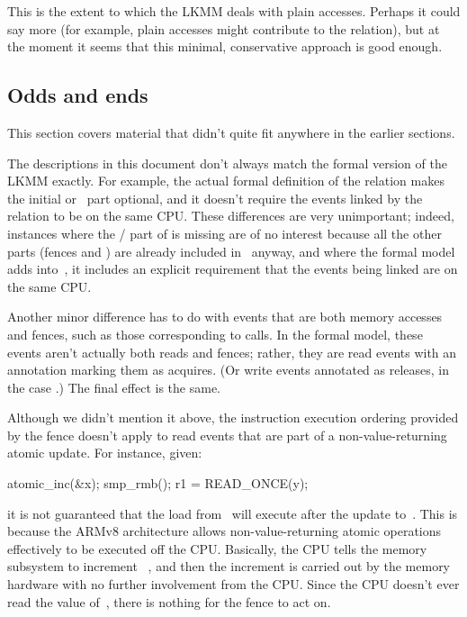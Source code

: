 This is the extent to which the LKMM deals with plain accesses.
Perhaps it could say more (for example, plain accesses might
contribute to the  relation), but at the moment it seems that this
minimal, conservative approach is good enough.


\subsection{Odds and ends}
\label{sec:docs:explanation:Odds and ends}

This section covers material that didn't quite fit anywhere in the
earlier sections.

The descriptions in this document don't always match the formal
version of the LKMM exactly.
For example, the actual formal
definition of the  relation makes the initial  or~ part
optional, and it doesn't require the events linked by the relation to
be on the same CPU\@.
These differences are very unimportant; indeed,
instances where the / part of  is missing
are of no interest
because all the other parts (fences and ) are already included in~%
 anyway, and where the formal model adds  into~,
it includes
an explicit requirement that the events being linked are on the same
CPU\@.

Another minor difference has to do with events that are both memory
accesses and fences, such as those corresponding to 
calls.
In the formal model, these events aren't actually both reads
and fences; rather, they are read events with an annotation marking
them as acquires.
(Or write events annotated as releases, in the case
.)
The final effect is the same.

Although we didn't mention it above, the instruction execution
ordering provided by the  fence doesn't apply to read events
that are part of a non-value-returning atomic update.
For instance,
given:

\begin{VerbatimU}
	atomic_inc(&x);
	smp_rmb();
	r1 = READ_ONCE(y);
\end{VerbatimU}

\noindent%
it is not guaranteed that the load from~ will execute after the
update to~.
This is because the ARMv8 architecture allows
non-value-returning atomic operations effectively to be executed off
the CPU\@.
Basically, the CPU tells the memory subsystem to increment~%
, and then the increment is carried out by the memory hardware with
no further involvement from the CPU\@.
Since the CPU doesn't ever read
the value of~, there is nothing for the  fence to act on.

